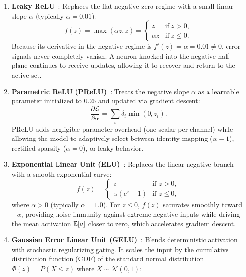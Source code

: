 \begin{enumerate}[leftmargin=*]
  \item \textbf{Leaky ReLU}~\cite{maas2013rectifier}: Replaces the flat negative zero regime with a small linear slope $\alpha$ (typically $\alpha = 0.01$):
    \begin{equation}
    f(z) = \max(\alpha z, z) = \begin{cases} z & \text{if } z > 0, \\ \alpha z & \text{if } z \le 0. \end{cases}
    \label{eq:leaky_relu}
    \end{equation}
    Because its derivative in the negative regime is $f'(z) = \alpha = 0.01 \ne 0$, error signals never completely vanish. A neuron knocked into the negative half-plane continues to receive updates, allowing it to recover and return to the active set.
  \item \textbf{Parametric ReLU (PReLU)}~\cite{he2015delving}: Treats the negative slope $\alpha$ as a learnable parameter initialized to $0.25$ and updated via gradient descent:
    \begin{equation}
    \frac{\partial \mathcal{L}}{\partial \alpha} = \sum_{i} \delta_i \min(0, z_i).
    \label{eq:prelu_gradient}
    \end{equation}
    PReLU adds negligible parameter overhead (one scalar per channel) while allowing the model to adaptively select between identity mapping ($\alpha = 1$), rectified sparsity ($\alpha = 0$), or leaky behavior.
  \item \textbf{Exponential Linear Unit (ELU)}~\cite{clevert2015fast}: Replaces the linear negative branch with a smooth exponential curve:
    \begin{equation}
    f(z) = \begin{cases} z & \text{if } z > 0, \\ \alpha (e^z - 1) & \text{if } z \le 0, \end{cases}
    \label{eq:elu_definition}
    \end{equation}
    where $\alpha > 0$ (typically $\alpha = 1.0$). For $z \le 0$, $f(z)$ saturates smoothly toward $-\alpha$, providing noise immunity against extreme negative inputs while driving the mean activation $\mathbb{E}[a]$ closer to zero, which accelerates gradient descent.
  \item \textbf{Gaussian Error Linear Unit (GELU)}~\cite{hendrycks2016gaussian}: Blends deterministic activation with stochastic regularizing gating. It scales the input by the cumulative distribution function (CDF) of the standard normal distribution $\Phi(z) = P(X \le z)$ where $X \sim \mathcal{N}(0, 1)$:

\end{enumerate}
